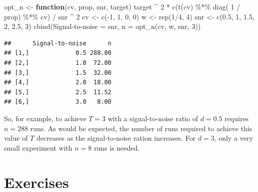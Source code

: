 \documentclass[
]{book}
\newenvironment{Shaded}{\begin{snugshade}}{\end{snugshade}}
\newcommand{\ControlFlowTok}[1]{\textcolor[rgb]{0.13,0.29,0.53}{\textbf{#1}}}
\newcommand{\DecValTok}[1]{\textcolor[rgb]{0.00,0.00,0.81}{#1}}
\newcommand{\FloatTok}[1]{\textcolor[rgb]{0.00,0.00,0.81}{#1}}
\newcommand{\FunctionTok}[1]{\textcolor[rgb]{0.00,0.00,0.00}{#1}}
\newcommand{\NormalTok}[1]{#1}
\newcommand{\OtherTok}[1]{\textcolor[rgb]{0.56,0.35,0.01}{#1}}
\newcommand{\SpecialCharTok}[1]{\textcolor[rgb]{0.00,0.00,0.00}{#1}}
\newcommand{\StringTok}[1]{\textcolor[rgb]{0.31,0.60,0.02}{#1}}
\theoremstyle{definition}
\theoremstyle{definition}
\theoremstyle{definition}
\theoremstyle{definition}
\theoremstyle{remark}
\begin{document}
\begin{Shaded}
\begin{Highlighting}[]
\NormalTok{opt\_n }\OtherTok{\textless{}{-}} \ControlFlowTok{function}\NormalTok{(cv, prop, snr, target) target }\SpecialCharTok{\^{}} \DecValTok{2} \SpecialCharTok{*} \FunctionTok{c}\NormalTok{(}\FunctionTok{t}\NormalTok{(cv) }\SpecialCharTok{\%*\%} \FunctionTok{diag}\NormalTok{( }\DecValTok{1} \SpecialCharTok{/}\NormalTok{ prop) }\SpecialCharTok{\%*\%}\NormalTok{ cv) }\SpecialCharTok{/}\NormalTok{ snr }\SpecialCharTok{\^{}} \DecValTok{2}
\NormalTok{cv }\OtherTok{\textless{}{-}} \FunctionTok{c}\NormalTok{(}\SpecialCharTok{{-}}\DecValTok{1}\NormalTok{, }\DecValTok{1}\NormalTok{, }\DecValTok{0}\NormalTok{, }\DecValTok{0}\NormalTok{)}
\NormalTok{w }\OtherTok{\textless{}{-}} \FunctionTok{rep}\NormalTok{(}\DecValTok{1}\SpecialCharTok{/}\DecValTok{4}\NormalTok{, }\DecValTok{4}\NormalTok{)}
\NormalTok{snr }\OtherTok{\textless{}{-}} \FunctionTok{c}\NormalTok{(}\FloatTok{0.5}\NormalTok{, }\DecValTok{1}\NormalTok{, }\FloatTok{1.5}\NormalTok{, }\DecValTok{2}\NormalTok{, }\FloatTok{2.5}\NormalTok{, }\DecValTok{3}\NormalTok{)}
\FunctionTok{cbind}\NormalTok{(}\StringTok{\textquotesingle{}Signal{-}to{-}noise\textquotesingle{}} \OtherTok{=}\NormalTok{ snr, }\StringTok{\textquotesingle{}n\textquotesingle{}} \OtherTok{=} \FunctionTok{opt\_n}\NormalTok{(cv, w, snr, }\DecValTok{3}\NormalTok{))}
\end{Highlighting}
\end{Shaded}

\begin{verbatim}
##      Signal-to-noise      n
## [1,]             0.5 288.00
## [2,]             1.0  72.00
## [3,]             1.5  32.00
## [4,]             2.0  18.00
## [5,]             2.5  11.52
## [6,]             3.0   8.00
\end{verbatim}

So, for example, to achieve \(T = 3\) with a signal-to-noise ratio of \(d=0.5\) requires \(n=288\) runs. As would be expected, the number of runs required to achieve this value of \(T\) decreases as the signal-to-noise ration increases. For \(d=3\), only a very small experiment with \(n=8\) runs is needed.

\hypertarget{exercises-1}{%
\section{Exercises}\label{exercises-1}}
\end{document}

